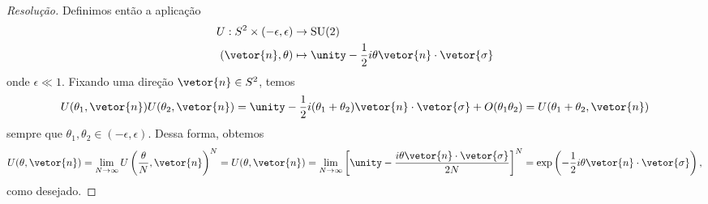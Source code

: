 \begin{proof}[Resolução]
    Definimos então a aplicação
    \begin{align*}
        U : S^2 \times (-\epsilon, \epsilon) &\to \mathrm{SU}(2)\\
                          (\vetor{n},\theta) &\mapsto \unity - \frac12 i \theta \vetor{n} \cdot \vetor{\sigma}
    \end{align*}
    onde \(\epsilon \ll 1\). Fixando uma direção \(\vetor{n} \in S^2\), temos
    \begin{equation*}
        U(\theta_1, \vetor{n}) U(\theta_2, \vetor{n}) = \unity - \frac12 i(\theta_1 + \theta_2)\vetor{n}\cdot\vetor{\sigma} + O(\theta_1 \theta_2) = U(\theta_1 + \theta_2, \vetor{n})
    \end{equation*}
    sempre que \(\theta_1, \theta_2 \in (-\epsilon, \epsilon)\). Dessa forma, obtemos
    \begin{equation*}
        U(\theta,\vetor{n}) = \lim_{N \to \infty} U\left(\frac{\theta}{N}, \vetor{n}\right)^N = U(\theta,\vetor{n}) = \lim_{N\to \infty} \left[\unity - \frac{i \theta \vetor{n}\cdot \vetor{\sigma}}{2N}\right]^N = \exp\left(-\frac12 i \theta \vetor{n}\cdot\vetor{\sigma}\right),
    \end{equation*}
    como desejado.
\end{proof}
